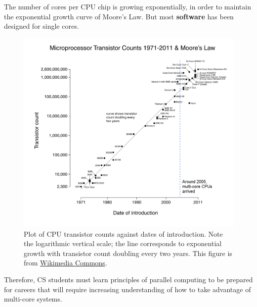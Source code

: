 \documentclass[letterpaper,10pt,openany,oneside]{sphinxmanual}
\begin{document}
The number of cores per CPU chip is growing exponentially, in order to maintain the exponential growth curve of Moore's Law. But most \textbf{software} has been designed for single cores.
\begin{figure}[htbp]
\centering
\capstart

\includegraphics{MooresLaw.png}
\caption{Plot of CPU transistor counts against dates of introduction. Note the logarithmic vertical scale; the line corresponds to exponential growth with transistor count doubling every two years. This figure is from \href{http://en.wikipedia.org/wiki/File:Transistor\_Count\_and\_Moore\%27s\_Law\_-\_2011.svg}{Wikimedia Commons}.}\end{figure}

Therefore, CS students must learn principles of parallel computing to be prepared for careers that will require increasing understanding of how to take advantage of multi-core systems.
\end{document}
